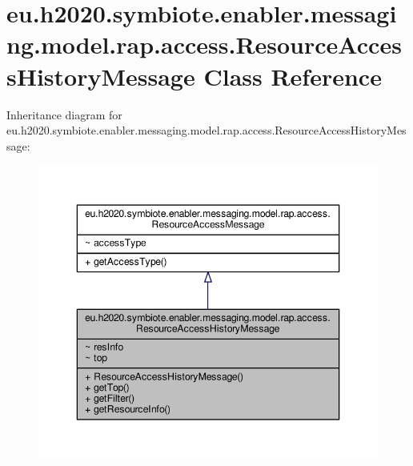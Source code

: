 \hypertarget{classeu_1_1h2020_1_1symbiote_1_1enabler_1_1messaging_1_1model_1_1rap_1_1access_1_1ResourceAccessHistoryMessage}{}\section{eu.\+h2020.\+symbiote.\+enabler.\+messaging.\+model.\+rap.\+access.\+Resource\+Access\+History\+Message Class Reference}
\label{classeu_1_1h2020_1_1symbiote_1_1enabler_1_1messaging_1_1model_1_1rap_1_1access_1_1ResourceAccessHistoryMessage}


Inheritance diagram for eu.\+h2020.\+symbiote.\+enabler.\+messaging.\+model.\+rap.\+access.\+Resource\+Access\+History\+Message\+:
\nopagebreak
\begin{figure}[H]
\begin{center}
\leavevmode
\includegraphics[width=346pt]{classeu_1_1h2020_1_1symbiote_1_1enabler_1_1messaging_1_1model_1_1rap_1_1access_1_1ResourceAccessHistoryMessage__inherit__graph}
\end{center}
\end{figure}


